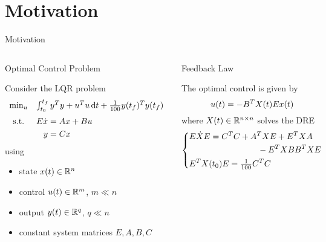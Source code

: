 \section{Motivation}

\begin{frame}{Motivation}
  \begin{columns}[t,onlytextwidth]
  \begin{block}{\strut Optimal Control Problem}
    Consider the \acf{LQR} problem
    \begin{equation*}
      \begin{array}{cl}
        \min_u & \int_{t_0}^{t_f} y^\T y + u^\T u \dt + \tfrac{1}{100} y(t_f)^\T y(t_f) \medskip\\
        \text{s.t.} & \begin{aligned}[t]
          E \dot x &= Ax + Bu \\
          y &= Cx
        \end{aligned}
      \end{array}
    \end{equation*}
    using
    \begin{itemize}
      \item
        state $x(t)\in\mathbb{R}^n$
      \item
        control $u(t)\in\mathbb{R}^m$, $m\ll n$
      \item
        output $y(t)\in\mathbb{R}^q$, $q\ll n$
      \item
        constant system matrices $E,A,B,C$
    \end{itemize}
  \end{block}
  \pause
  \begin{block}{\strut Feedback Law \parencite[e.g.][]{Locatelli2011}}
    The optimal control is given by
    \begin{equation*}
      u(t) = -
        B^T X(t) E
      x(t)
    \end{equation*}
    where $X(t)\in\mathbb{R}^{n\times n}$ solves the \acf{DRE}
    \begin{equation*}
      \left\{
        \begin{lgathered}
          E\dot X E = \begin{multlined}[t]
            C^\T C + A^\T X E + E^\T X A \\ - E^\T X BB^\T X E
          \end{multlined} \\
          E^\T X(t_0) E = \tfrac{1}{100} C^\T C
        \end{lgathered}
      \right.
    \end{equation*}
  \end{block}
  \end{columns}
\end{frame}

